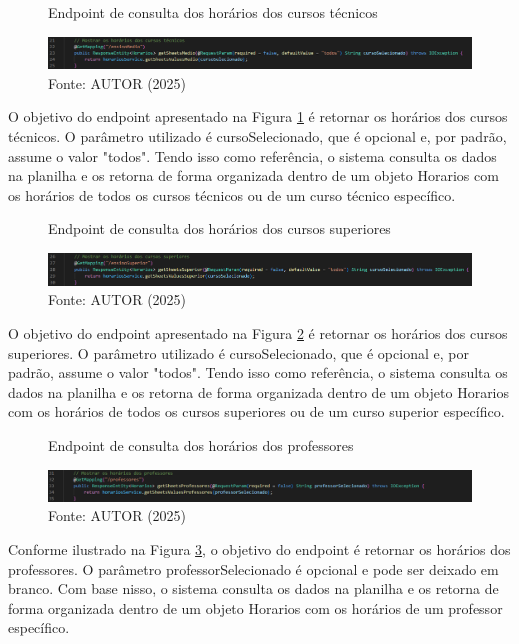 \begin{itemize}
    \begin{figure}[htb]
        \centering
        \caption{Endpoint de consulta dos horários dos cursos técnicos}
        \includegraphics[width=1\textwidth]{Figuras/back-3.png}
        \caption*{Fonte: AUTOR (2025)}
        \label{fig_back_3}
    \end{figure}

    O objetivo do endpoint apresentado na Figura \ref{fig_back_3} é retornar os horários dos cursos técnicos. O parâmetro utilizado é cursoSelecionado, que é opcional e, por padrão, assume o valor "todos". Tendo isso como referência, o sistema consulta os dados na planilha e os retorna de forma organizada dentro de um objeto Horarios com os horários de todos os cursos técnicos ou de um curso técnico específico.

    \begin{figure}[htb]
        \centering
        \caption{Endpoint de consulta dos horários dos cursos superiores}
        \includegraphics[width=1\textwidth]{Figuras/back-4.png}
        \caption*{Fonte: AUTOR (2025)}
        \label{fig_back_4}
    \end{figure}

    O objetivo do endpoint apresentado na Figura \ref{fig_back_4} é retornar os horários dos cursos superiores. O parâmetro utilizado é cursoSelecionado, que é opcional e, por padrão, assume o valor "todos". Tendo isso como referência, o sistema consulta os dados na planilha e os retorna de forma organizada dentro de um objeto Horarios com os horários de todos os cursos superiores ou de um curso superior específico.

    \begin{figure}[htb]
        \centering
        \caption{Endpoint de consulta dos horários dos professores}
        \includegraphics[width=1\textwidth]{Figuras/back-5.png}
        \caption*{Fonte: AUTOR (2025)}
        \label{fig_back_5}
    \end{figure}

    Conforme ilustrado na Figura \ref{fig_back_5}, o objetivo do endpoint é retornar os horários dos professores. O parâmetro professorSelecionado é opcional e pode ser deixado em branco. Com base nisso, o sistema consulta os dados na planilha e os retorna de forma organizada dentro de um objeto Horarios com os horários de um professor específico.


\end{itemize}
